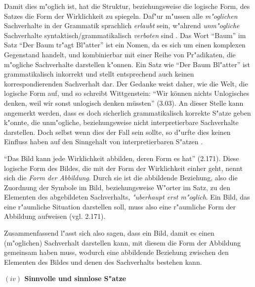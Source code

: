 \documentclass[a4paper, emulatestandardclasses, 12pt]{scrartcl}
\begin{document}
\begin{onehalfspace}

Damit dies m"oglich ist, hat die Struktur, beziehungsweise die logische Form, des Satzes die Form der Wirklichkeit zu spiegeln. Daf"ur m"ussen alle \emph{m"oglichen} Sachverhalte in der Grammatik sprachlich \emph{erlaubt} sein, w"ahrend \emph{unm"ogliche} Sachverhalte syntaktisch/grammatikalisch \emph{verboten} sind \cite[vgl.][S. 85 f.]{emiliani1999formsp}. Das Wort "`Baum"' im Satz "`Der Baum tr"agt Bl"atter"' ist ein Nomen, da es sich um einen komplexen Gegenstand handelt, und kombinierbar mit einer Reihe von Pr"adikaten, die m"ogliche Sachverhalte darstellen k"onnen. Ein Satz wie "`Der Baum Bl"atter"' ist grammatikalisch inkorrekt und stellt entsprechend auch keinen korrespondierenden Sachverhalt dar. Der Gedanke weist daher, wie die Welt, die logische Form auf, und so schreibt Wittgenstein: "`Wir können nichts Unlogisches denken, weil wir sonst unlogisch denken müssten"' (3.03). An dieser Stelle kann angemerkt werden, dass es doch sicherlich grammatikalisch korrekte S"atze geben k"onnte, die unm"ogliche, beziehungsweise nicht interpretierbare Sachverhalte darstellen. Doch selbst wenn dies der Fall sein sollte, so d"urfte dies keinen Einfluss haben auf den Sinngehalt von interpretierbaren S"atzen \cite[vgl.][S. 88 f.]{emiliani1999formsp}. 

"`Das Bild kann jede Wirklichkeit abbilden, deren Form es hat"' (2.171). Diese logische Form des Bildes, die mit der Form der Wirklichkeit einher geht, nennt sich die \emph{Form der Abbildung}. Durch sie ist die abbildende Beziehung, also die Zuordnung der Symbole im Bild, beziehungsweise W"orter im Satz, zu den Elementen des abgebildeten Sachverhalts, \emph{"uberhaupt erst m"oglich}. Ein Bild, das eine r"aumliche Situation darstellen soll, muss also eine r"aumliche Form der Abbildung aufweisen (vgl. 2.171). 


Zusammenfassend l"asst sich also sagen, dass ein Bild, damit es einen (m"oglichen) Sachverhalt darstellen kann, mit diesem die Form der Abbildung gemeinsam haben muss, wodurch
 eine abbildende Beziehung zwischen den Elementen des Bildes und denen des Sachverhalts bestehen kann.


\vspace{5mm}
\noindent\textbf{$(iv)$ Sinnvolle und sinnlose S"atze}	


\end{onehalfspace}
\end{document}
